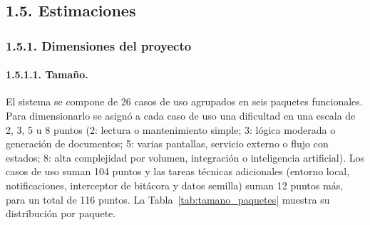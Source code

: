 \subsection{1.5. Estimaciones}

\subsubsection{1.5.1. Dimensiones del proyecto}

\paragraph{1.5.1.1. Tamaño.}

El sistema se compone de 26 casos de uso agrupados en seis paquetes funcionales. Para dimensionarlo se asignó a cada caso de uso una dificultad en una escala de 2, 3, 5 u 8 puntos (2: lectura o mantenimiento simple; 3: lógica moderada o generación de documentos; 5: varias pantallas, servicio externo o flujo con estados; 8: alta complejidad por volumen, integración o inteligencia artificial). Los casos de uso suman 104 puntos y las tareas técnicas adicionales (entorno local, notificaciones, interceptor de bitácora y datos semilla) suman 12 puntos más, para un total de 116 puntos. La Tabla~\ref{tab:tamano_paquetes} muestra su distribución por paquete.

